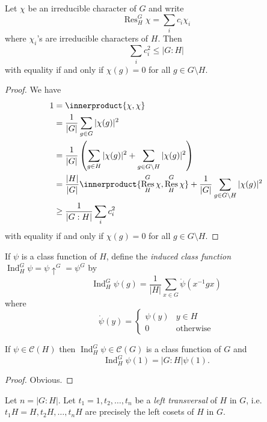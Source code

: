 \documentclass[a4paper]{article}
\newcommand*{\ip}{\innerproduct} %
\DeclareMathOperator{\Res}{Res} %
\DeclareMathOperator{\Ind}{Ind} %
\theoremstyle{definition}
\begin{document}
\begin{lemma}
  Let \(\chi\) be an irreducible character of \(G\) and write
  \[
    \Res_H^G \chi = \sum_i c_i \chi_i
  \]
  where \(\chi_i\)'s are irreducible characters of \(H\). Then
  \[
    \sum_i c_i^2 \leq |G:H|
  \]
  with equality if and only if \(\chi(g) = 0\) for all \(g \in G \setminus H\).
\end{lemma}

\begin{proof}
  We have
  \begin{align*}
    1
    &= \ip{\chi, \chi} \\
    &= \frac{1}{|G|} \sum_{g \in G} |\chi(g)|^2 \\
    &= \frac{1}{|G|} \left(\sum_{g \in H} |\chi(g)|^2 + \sum_{g \in G \setminus H} |\chi(g)|^2 \right) \\
    &= \frac{|H|}{|G|} \ip{\Res_H^G \chi, \Res_H^G \chi} + \frac{1}{|G|} \sum_{g \in G \setminus H} |\chi(g)|^2 \\
    &\geq \frac{1}{|G:H|} \sum_i c_i^2
  \end{align*}
  with equality if and only if \(\chi(g) = 0\) for all \(g \in G \setminus H\).
\end{proof}

\begin{definition}[induction]
  If \(\psi\) is a class function of \(H\), define the \emph{induced class function} \(\Ind_H^G \psi = \psi \uparrow^G = \psi^G\) by
  \[
    \Ind_H^G \psi (g) = \frac{1}{|H|} \sum_{x \in G} \ocirc \psi(x^{-1} gx)
  \]
  where
  \[
    \ocirc \psi(y) =
    \begin{cases}
      \psi(y) & y \in H \\
      0 & \text{otherwise}
    \end{cases}
  \]
\end{definition}

\begin{lemma}
  If \(\psi \in \mathcal C(H)\) then \(\Ind_H^G \psi \in \mathcal C(G)\) is a class function of \(G\) and
  \[
    \Ind_H^G \psi(1) = |G:H| \psi(1).
  \]
\end{lemma}

\begin{proof}
  Obvious.
\end{proof}

Let \(n = |G:H|\). Let \(t_1 = 1, t_2, \dots, t_n\) be a \emph{left transversal} of \(H\) in \(G\), i.e.\ \(t_1H = H, t_2H, \dots, t_nH\) are precisely the left cosets of \(H\) in \(G\).
\end{document}

